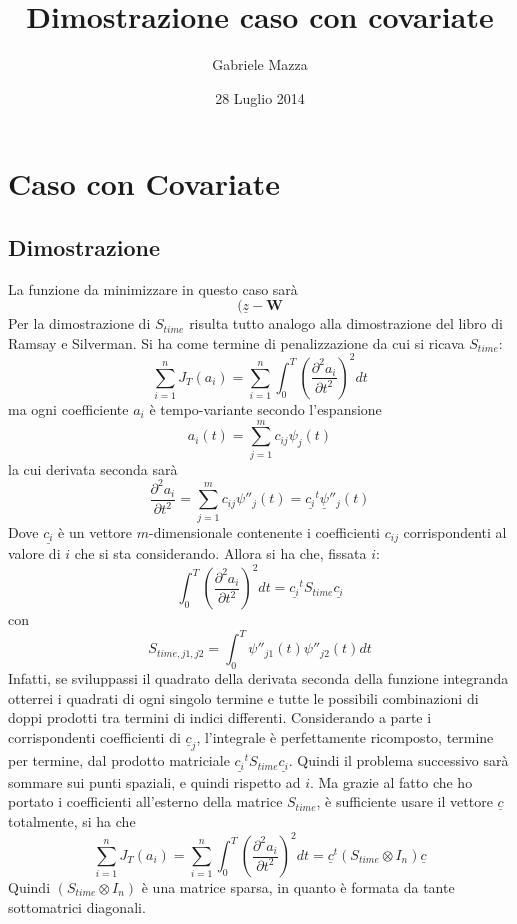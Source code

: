 \documentclass[a4paper,12pt]{report}				%
\date{28 Luglio 2014}
\author{Gabriele Mazza}
\title{Dimostrazione caso con covariate}
\begin{document}

\chapter{Caso con Covariate}

\section{Dimostrazione}
La funzione da minimizzare in questo caso sarà
$$
(\underline{z}-\bm{W}
$$
Per la dimostrazione di $S_{time}$ risulta tutto analogo alla dimostrazione del libro di Ramsay e Silverman.
\newline
Si ha come termine di penalizzazione da cui si ricava $S_{time}$:
$$
\sum_{i=1}^n J_T(a_i)=\sum_{i=1}^n \int_0^T (\frac{\partial^2a_i}{\partial t^2})^2 dt
$$
ma ogni coefficiente $a_i$ è tempo-variante secondo l'espansione
$$
a_i(t)=\sum_{j=1}^m c_{ij}\psi_j(t)
$$
la cui derivata seconda sarà
$$
\frac{\partial^2a_i}{\partial t^2}=\sum_{j=1}^m c_{ij}\psi''_j(t)= \underline{c_i}^t\underline{\psi}''_j(t) 
$$
Dove $\underline{c_i}$ è un vettore $m$-dimensionale contenente i coefficienti $c_{ij}$ corrispondenti al valore di $i$ che si sta considerando.
\newline
Allora si ha che, fissata $i$:
$$
\int_0^T (\frac{\partial^2a_i}{\partial t^2})^2 dt = \underline{c_i}^t S_{time} \underline{c_i}
$$
con
$$
S_{time,j1,j2}=\int_0^T\psi''_{j1}(t)\psi''_{j2}(t)dt
$$
Infatti, se sviluppassi il quadrato della derivata seconda della funzione integranda otterrei i quadrati
di ogni singolo termine e tutte le possibili combinazioni di doppi prodotti tra termini di indici differenti. Considerando a parte i corrispondenti coefficienti di $\underline{c}_j$, l'integrale è perfettamente ricomposto, termine per termine, dal prodotto matriciale $\underline{c_i}^t S_{time} \underline{c_i}$.
\newline
\newline
Quindi il problema successivo sarà sommare sui punti spaziali, e quindi rispetto ad $i$. Ma grazie al fatto che ho portato i coefficienti all'esterno della matrice $S_{time}$, è sufficiente usare il vettore $\underline{c}$ totalmente, si ha che
$$
\sum_{i=1}^n J_T(a_i)=\sum_{i=1}^n \int_0^T (\frac{\partial^2a_i}{\partial t^2})^2 dt=\underline{c}^t (S_{time}\otimes I_n) \underline{c}
$$
Quindi $(S_{time}\otimes I_n)$ è una matrice sparsa, in quanto è formata da tante sottomatrici diagonali.
\end{document}
